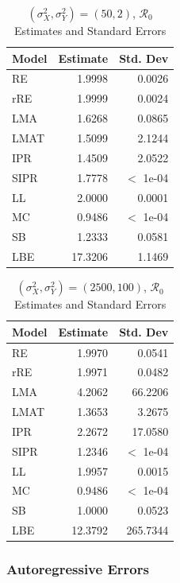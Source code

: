 \documentclass[12pt]{article}
\newcommand{\rr}{\ensuremath{\mathcal{R}_0}}
\begin{document}
\begin{table}[H]
	
	
	\centering
	\begin{tabular}[t]{l|r|r}
		\hline
		Model & Estimate & Std. Dev\\
		\hline
		RE & 1.9998 & 0.0026\\
		\hline
		rRE & 1.9999 & 0.0024\\
		\hline
		LMA & 1.6268 & 0.0865\\
		\hline
		LMAT & 1.5099 & 2.1244\\
		\hline
		IPR & 1.4509 & 2.0522\\
		\hline
		SIPR & 1.7778 & $<$ 1e-04\\
		\hline
		LL & 2.0000 & 0.0001\\
		\hline
		MC & 0.9486 & $<$ 1e-04\\
		\hline
		SB & 1.2333 & 0.0581\\
		\hline
		LBE & 17.3206 & 1.1469\\
		\hline
	\end{tabular}
	\caption{ $(\sigma^2_X, \sigma^2_Y) = (50, 2)$, $\rr$ Estimates and Standard Errors}
\end{table}

\begin{table}[H]
	
	
	\centering
	\begin{tabular}[t]{l|r|r}
		\hline
		Model & Estimate & Std. Dev\\
		\hline
		RE & 1.9970 & 0.0541\\
		\hline
		rRE & 1.9971 & 0.0482\\
		\hline
		LMA & 4.2062 & 66.2206\\
		\hline
		LMAT & 1.3653 & 3.2675\\
		\hline
		IPR & 2.2672 & 17.0580\\
		\hline
		SIPR & 1.2346 & $<$ 1e-04\\
		\hline
		LL & 1.9957 & 0.0015\\
		\hline
		MC & 0.9486 & $<$ 1e-04\\
		\hline
		SB & 1.0000 & 0.0523\\
		\hline
		LBE & 12.3792 & 265.7344\\
		\hline
	\end{tabular}
	\caption{$(\sigma^2_X, \sigma^2_Y) = (2500, 100)$, $\rr$ Estimates and Standard Errors}
\end{table}

\subsubsection{Autoregressive Errors}
\end{document}
